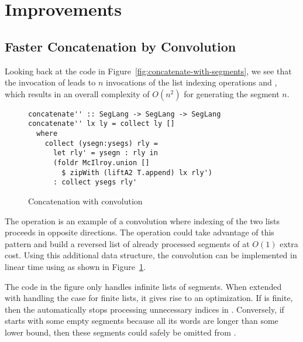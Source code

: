 \section{Improvements}
\label{sec:improvements}

\subsection{Faster Concatenation by Convolution}
\label{sec:faster-concatenation}
\label{sec:convolution}

Looking back at the code in
Figure~\ref{fig:concatenate-with-segments}, we see that the
invocation of  leads to $n$ invocations of the list
indexing operations  and , which
results in an  overall complexity of $O (n^2)$ for generating the
segment $n$.

\begin{figure}[tp]
\begin{lstlisting}
concatenate'' :: SegLang -> SegLang -> SegLang
concatenate'' lx ly = collect ly []
  where
    collect (ysegn:ysegs) rly =
      let rly' = ysegn : rly in
      (foldr McIlroy.union []
        $ zipWith (liftA2 T.append) lx rly')
      : collect ysegs rly'
\end{lstlisting}
\vspace{-\baselineskip}
  \caption{Concatenation with convolution}
  \label{fig:concatenation-with-convolution}
\end{figure}
The  operation is an example of a convolution where
indexing of the two lists proceeds in opposite directions. The  operation
could take advantage of this pattern and build a reversed list  of already
processed segments of  at $O(1)$ extra cost. Using this additional data structure, the
convolution can be implemented in linear time using
 as shown in Figure~\ref{fig:concatenation-with-convolution}.

The code in the figure only handles infinite lists of
segments. When extended with handling the case for finite lists,
it gives rise to an optimization. If  is finite,
then the  automatically stops processing unnecessary indices in
. Conversely, if  starts with some empty segments
because all its words are longer than some lower bound, then these
segments could safely be omitted from .

